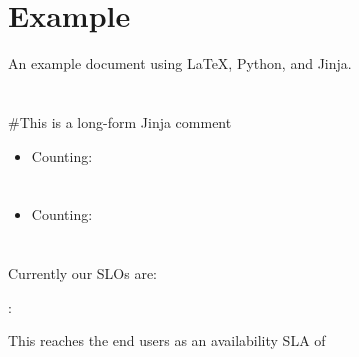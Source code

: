 \documentclass{article}
\begin{document}
\section{Example}
An example document using \LaTeX, Python, and Jinja.

\section{}
\#{This is a long-form Jinja comment}
\begin{itemize}
  \item Counting: 
\end{itemize}

\section{}
\begin{itemize}
  \item Counting: 
\end{itemize}

\section{}

Currently our SLOs are:

: 

This reaches the end users as an availability SLA of 
\end{document}
